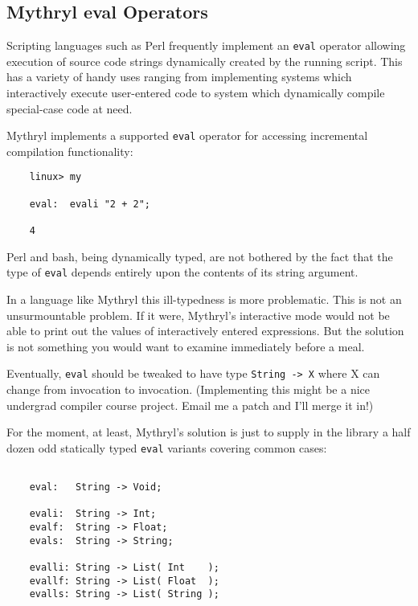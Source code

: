 \subsection{Mythryl eval Operators}

Scripting languages such as Perl frequently implement an {\tt eval} operator 
allowing execution of source code strings dynamically created by the running 
script.  This has a variety of handy uses ranging from implementing systems 
which interactively execute user-entered code to system which dynamically 
compile special-case code at need.

Mythryl implements a supported {\tt eval} operator for accessing incremental 
compilation functionality:

\begin{verbatim}
    linux> my

    eval:  evali "2 + 2";

    4
\end{verbatim}

Perl and bash, being dynamically typed, are not bothered by the fact 
that the type of {\tt eval} depends entirely upon the contents of its 
string argument.

In a language like Mythryl this ill-typedness is more 
problematic.  This is not an unsurmountable problem.  If it were, 
Mythryl's interactive mode would not be able to print out the 
values of interactively entered expressions.  But the solution 
is not something you would want to examine immediately before a meal.

Eventually, {\tt eval} should be tweaked to have type {\tt String -> X} 
where X can change from invocation to invocation.  (Implementing this 
might be a nice undergrad compiler course project.  Email me a patch 
and I'll merge it in!)

For the moment, at least, Mythryl's solution is just to supply in the 
library a half dozen odd statically typed {\tt eval} variants covering 
common cases:

\begin{verbatim}

    eval:   String -> Void;

    evali:  String -> Int;
    evalf:  String -> Float;
    evals:  String -> String;

    evalli: String -> List( Int    );
    evallf: String -> List( Float  );
    evalls: String -> List( String );

\end{verbatim}

